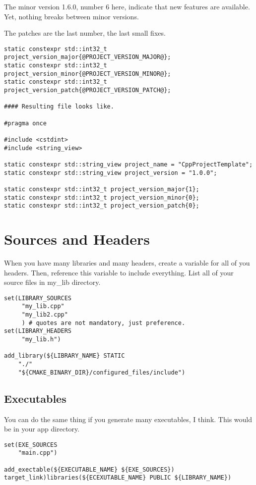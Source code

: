 \documentclass[openany]{report}
\begin{document}
The minor version 1.6.0, number 6 here, indicate that new features are available. Yet, nothing breaks between minor versions.

The patches are the last number, the last small fixes.

\begin{verbatim}
static constexpr std::int32_t project_version_major{@PROJECT_VERSION_MAJOR@};
static constexpr std::int32_t project_version_minor{@PROJECT_VERSION_MINOR@};
static constexpr std::int32_t project_version_patch{@PROJECT_VERSION_PATCH@};

#### Resulting file looks like.

#pragma once

#include <cstdint>
#include <string_view>

static constexpr std::string_view project_name = "CppProjectTemplate";
static constexpr std::string_view project_version = "1.0.0";

static constexpr std::int32_t project_version_major{1};
static constexpr std::int32_t project_version_minor{0};
static constexpr std::int32_t project_version_patch{0};
\end{verbatim}


\section{Sources and Headers}

When you have many libraries and many headers, create a variable for all of you headers. Then, reference this variable to include
everything. List all of your source files in my\_lib directory.

\begin{verbatim}
set(LIBRARY_SOURCES
     "my_lib.cpp"
     "my_lib2.cpp"
     ) # quotes are not mandatory, just preference.
set(LIBRARY_HEADERS
     "my_lib.h")

add_library(${LIBRARY_NAME} STATIC
    "./"
    "${CMAKE_BINARY_DIR}/configured_files/include")
\end{verbatim}

\subsection{Executables}

You can do the same thing if you generate many executables, I think. This would be in your app directory.

\begin{verbatim}
set(EXE_SOURCES
    "main.cpp")

add_exectable(${EXECUTABLE_NAME} ${EXE_SOURCES})
target_link)libraries(${ECEXUTABLE_NAME} PUBLIC ${LIBRARY_NAME})
\end{verbatim}
\end{document}
